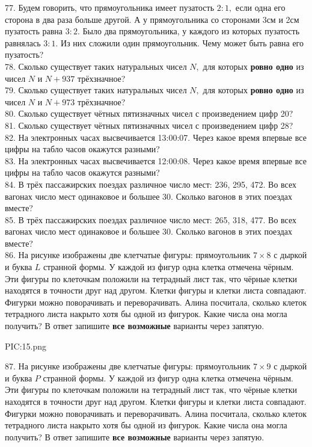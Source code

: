 77. Будем говорить, что прямоугольника имеет пузатость $2:1,$ если одна его сторона в два раза больше другой. А у прямоугольника со сторонами 3см и 2см пузатость равна $3:2.$ Было два прямоугольника, у каждого из которых пузатость равнялась $3:1.$ Из них сложили один прямоугольник. Чему может быть равна его пузатость?\\
78. Сколько существует таких натуральных чисел $N,$ для которых {\bf ровно одно} из чисел $N$ и $N+937$ трёхзначное?\\
79. Сколько существует таких натуральных чисел $N,$ для которых {\bf ровно одно} из чисел $N$ и $N+973$ трёхзначное?\\
80. Сколько существует чётных пятизначных чисел с произведением цифр 20?\\
81. Сколько существует чётных пятизначных чисел с произведением цифр 28?\\
82. На электронных часах высвечивается 13:00:07. Через какое время впервые все цифры на табло часов окажутся разными?\\
83. На электронных часах высвечивается 12:00:08. Через какое время впервые все цифры на табло часов окажутся разными?\\
84. В трёх пассажирских поездах различное число мест: 236, 295, 472. Во всех вагонах число мест одинаковое и большее 30. Сколько вагонов в этих поездах вместе?\\
85. В трёх пассажирских поездах различное число мест: 265, 318, 477. Во всех вагонах число мест одинаковое и большее 30. Сколько вагонов в этих поездах вместе?\\
86. На рисунке изображены две клетчатые фигуры: прямоугольник $7\times8$ с дыркой и буква $L$ странной формы. У каждой из фигур одна клетка отмечена чёрным. Эти фигуры по клеточкам положили на тетрадный лист так, что чёрные клетки находятся в точности друг над другом. Клетки фигуры и клетки листа совпадают. Фигурки можно поворачивать и переворачивать. Алина посчитала, сколько клеток тетрадного листа накрыто хотя бы одной из фигурок. Какие числа она могла получить? В ответ запишите {\bf все возможные} варианты через запятую.
\begin{center}
{{PIC:15.png}}
\end{center}
87. На рисунке изображены две клетчатые фигуры: прямоугольник $7\times9$ с дыркой и буква $P$ странной формы. У каждой из фигур одна клетка отмечена чёрным. Эти фигуры по клеточкам положили на тетрадный лист так, что чёрные клетки находятся в точности друг над другом. Клетки фигуры и клетки листа совпадают. Фигурки можно поворачивать и переворачивать. Алина посчитала, сколько клеток тетрадного листа накрыто хотя бы одной из фигурок. Какие числа она могла получить? В ответ запишите {\bf все возможные} варианты через запятую.
